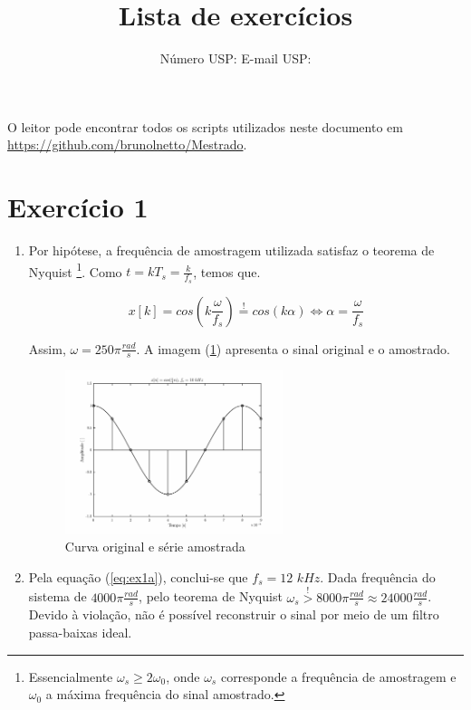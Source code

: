 \documentclass{article}
\title{Lista de exercícios \esnumber}
\author{\studentname \qquad Número USP: \uspid \qquad E-mail USP: \uspmail}
\begin{document}
\maketitle

O leitor pode encontrar todos os scripts utilizados neste documento em  \url{https://github.com/brunolnetto/Mestrado}.

\section*{Exercício 1}
\begin{enumerate}
\item %

Por hipótese, a frequência de amostragem utilizada satisfaz o teorema de Nyquist \footnote{Essencialmente $\omega_s \geq 2\omega_0$, onde $\omega_s$ corresponde a frequência de amostragem e $\omega_0$ a máxima frequência do sinal amostrado.}. Como $t = kT_s = \frac{k}{f_s}$, temos que.

\begin{equation}
\label{eq:ex1a}
x[k] = cos(k \frac{\omega}{f_s})  \stackrel{!}{=} cos(k \alpha) \Longleftrightarrow \alpha = \frac{\omega}{f_s}
\end{equation}

Assim, $\omega = 250\pi \frac{rad}{s}$. A imagem (\ref{fig:ex1}) apresenta o sinal original e o amostrado.

\begin{figure}[!h]
	\center
	\includegraphics[width=0.6\textwidth]{./images/ex1a.eps}
	\caption{Curva original e série amostrada}
	\label{fig:ex1}
\end{figure}

\item %
Pela equação (\ref{eq:ex1a}), conclui-se que $f_s = 12$ $kHz$. Dada frequência do sistema de $4000\pi \frac{rad}{s}$, pelo teorema de Nyquist $\omega_s \stackrel{!}{>} 8000\pi \frac{rad}{s} \approx 24000 \frac{rad}{s}$. Devido à violação, não é possível reconstruir o sinal por meio de um filtro passa-baixas ideal. 


\end{enumerate}
\end{document}
